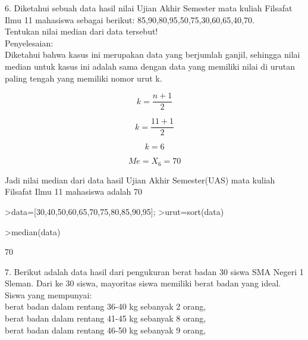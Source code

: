 \documentclass[12pt,arial,letterpaper]{book}
\begin{document}
\begin{eulernootebook}
\begin{eulercomment}
\begin{eulercomment}
\begin{eulernootebook}
\begin{eulercomment}
\begin{eulercomment}
\begin{eulercomment}
\begin{eulercomment}
\begin{eulercomment}
\begin{eulercomment}
\begin{eulercomment}
\begin{eulercomment}
\begin{eulercomment}
\begin{eulercomment}
\begin{eulercomment}
\begin{eulercomment}
\begin{eulercomment}
\begin{eulercomment}
6. Diketahui sebuah data hasil nilai Ujian Akhir Semester mata kuliah
Filsafat Ilmu 11 mahasiswa sebagai berikut:
85,90,80,95,50,75,30,60,65,40,70.\\
Tentukan nilai median dari data tersebut!\\
Penyelesaian:\\
Diketahui bahwa kasus ini merupakan data yang berjumlah ganjil,
sehingga nilai median untuk kasus ini adalah sama dengan data yang
memiliki nilai di urutan paling tengah yang memiliki nomor urut k.\\
\end{eulercomment}
\begin{eulerformula}
\[
k = \frac{n+1}{2}
\]
\end{eulerformula}
\begin{eulerformula}
\[
k = \frac{11+1}{2}
\]
\end{eulerformula}
\begin{eulerformula}
\[
k = 6
\]
\end{eulerformula}
\begin{eulerformula}
\[
Me = X_6 = 70
\]
\end{eulerformula}
\begin{eulercomment}
Jadi nilai median dari data hasil Ujian Akhir Semester(UAS) mata
kuliah Filsafat Ilmu 11 mahasiswa adalah 70
\end{eulercomment}
\begin{eulerprompt}
>data=[30,40,50,60,65,70,75,80,85,90,95];
>urut=sort(data)
\end{eulerprompt}
\begin{euleroutput}
  [30,  40,  50,  60,  65,  70,  75,  80,  85,  90,  95]
\end{euleroutput}
\begin{eulerprompt}
>median(data)
\end{eulerprompt}
\begin{euleroutput}
  70
\end{euleroutput}
\begin{eulercomment}
7. Berikut adalah data hasil dari pengukuran berat badan 30 siswa SMA
Negeri 1 Sleman. Dari ke 30 siswa, mayoritas siswa memiliki berat
badan yang ideal.\\
Siswa yang mempunyai:\\
berat badan dalam rentang 36-40 kg sebanyak 2 orang,  \\
berat badan dalam rentang 41-45 kg sebanyak 8 orang,\\
berat badan dalam rentang 46-50 kg sebanyak 9 orang,\\

\end{eulercomment}
\end{eulercomment}
\end{eulercomment}
\end{eulercomment}
\end{eulercomment}
\end{eulercomment}
\end{eulercomment}
\end{eulercomment}
\end{eulercomment}
\end{eulercomment}
\end{eulercomment}
\end{eulercomment}
\end{eulercomment}
\end{eulercomment}
\end{eulernootebook}
\end{eulercomment}
\end{eulercomment}
\end{eulernootebook}
\end{document}

